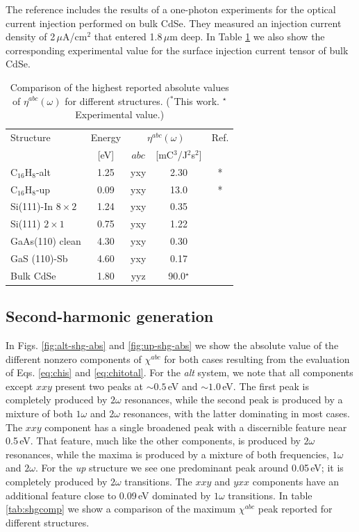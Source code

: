 \documentclass[pss]{wiley2sp} %
\begin{document}
The reference \cite{lamanAPL99} includes the results of a one-photon experiments for the optical current injection performed on bulk CdSe. They measured an injection current density of 2\,$\mu$A/cm$^{2}$ that entered 1.8\,$\mu$m deep. In Table \ref{tab:etacomp} we also show the corresponding experimental value for the surface injection current tensor of bulk CdSe.


\begin{table}%
  \sidecaption
  \begin{tabular}{lcccc}
  \hline
    Structure & Energy &  \multicolumn{2}{c}{$\eta^{abc}(\omega)$} &  Ref.\\
    \cline{3-4}
              & [eV]   & $abc$ & [mC$^{3}$/J$^{2}$s$^{2}$] \\
    \hline
    C$_{16}$H$_{8}$-alt     & 1.25  & yxy & 2.30  & *     \\
    C$_{16}$H$_{8}$-up      & 0.09  & yxy & 13.0  & *     \\
    Si(111)-In $8\times2$   & 1.24  & yxy & 0.35  & \cite{arzatePRB14}  \\
    Si(111) $2\times1$      & 0.75  & yxy & 1.22  & \cite{mendozaPRB12} \\
    GaAs(110) clean         & 4.30  & yxy & 0.30  & \cite{nastosPRB07}     \\
    GaS (110)-Sb            & 4.60  & yxy & 0.17  & \cite{cabellosPRB11}\\
    Bulk CdSe               & 1.80  & yyz & 90.0$^{\star}$  & \cite{lamanAPL99}  \\
  \hline
  \end{tabular}
  \caption[]{%
  Comparison of the highest reported absolute values of {$\eta^{abc}(\omega)$} for 
    different structures. ($^{*}$This work. $^{\star}$Experimental value.)}
  \label{tab:etacomp}
\end{table}

\subsection{Second-harmonic generation}
In Figs. \ref{fig:alt-shg-abs} and \ref{fig:up-shg-abs} we show the absolute value of the different nonzero components of $\chi^{abc}$ for both cases resulting from the evaluation of Eqs. \eqref{eq:chis} and \eqref{eq:chitotal}. For the \emph{alt} system, we note that all components except $xxy$ present two peaks at $\sim0.5$\,eV and $\sim1.0$\,eV. The first peak is completely produced by $2\omega$ resonances, while the second peak is produced by a mixture of both $1\omega$ and $2\omega$ resonances, with the latter dominating in most cases. The $xxy$ component has a single broadened peak with a discernible feature near 0.5\,eV. That feature, much like the other components, is produced by $2\omega$ resonances, while the maxima is produced by a mixture of both frequencies, $1\omega$ and $2\omega$. For the \emph{up} structure we see one predominant peak around 0.05\,eV; it is completely produced by $2\omega$ transitions. The $xxy$ and $yxx$ components have an additional feature close to 0.09\,eV dominated by $1\omega$ transitions. In table \ref{tab:shgcomp} we show a comparison of the maximum $\chi^{abc}$ peak reported for different structures.
\end{document}
